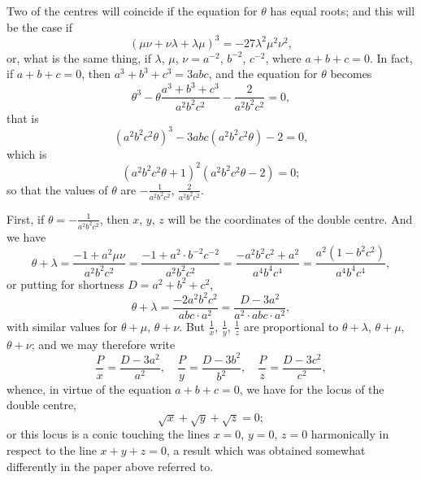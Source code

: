 \documentclass[11pt,a4paper]{article}
\theoremstyle{plain}
\begin{document}
Two of the centres will coincide if the equation for $\theta$ has equal roots; and this will be the case if
\[
(\mu\nu + \nu\lambda + \lambda\mu)^3 = -27\lambda^2\mu^2\nu^2,
\]
or, what is the same thing, if $\lambda$, $\mu$, $\nu = a^{-2}$, $b^{-2}$, $c^{-2}$, where $a + b + c = 0$. In fact, if $a + b + c = 0$, then $a^3 + b^3 + c^3 = 3abc$, and the equation for $\theta$ becomes
\[
\theta^3 - \theta\frac{a^3 + b^3 + c^3}{a^2b^2c^2} - \frac{2}{a^2b^2c^2} = 0,
\]
that is
\[
(a^2b^2c^2\theta)^3 - 3abc(a^2b^2c^2\theta) - 2 = 0,
\]
which is
\[
(a^2b^2c^2\theta + 1)^2(a^2b^2c^2\theta - 2) = 0;
\]
so that the values of $\theta$ are $-\frac{1}{a^2b^2c^2}$, $\frac{2}{a^2b^2c^2}$.

\newpage
First, if $\theta = -\frac{1}{a^2b^2c^2}$, then $x$, $y$, $z$ will be the coordinates of the double centre. And we have
\[
\theta + \lambda = \frac{-1 + a^2\mu\nu}{a^2b^2c^2} = \frac{-1 + a^2 \cdot b^{-2}c^{-2}}{a^2b^2c^2} = \frac{-a^2b^2c^2 + a^2}{a^4b^4c^4} = \frac{a^2(1 - b^2c^2)}{a^4b^4c^4},
\]
or putting for shortness $D = a^2 + b^2 + c^2$,
\[
\theta + \lambda = \frac{-2a^2b^2c^2}{abc \cdot a^2} = \frac{D - 3a^2}{a^2 \cdot abc \cdot a^2},
\]
with similar values for $\theta + \mu$, $\theta + \nu$. But $\frac{1}{x}$, $\frac{1}{y}$, $\frac{1}{z}$ are proportional to $\theta + \lambda$, $\theta + \mu$, $\theta + \nu$; and we may therefore write
\[
\frac{P}{x} = \frac{D - 3a^2}{a^2}, \quad \frac{P}{y} = \frac{D - 3b^2}{b^2}, \quad \frac{P}{z} = \frac{D - 3c^2}{c^2},
\]
whence, in virtue of the equation $a + b + c = 0$, we have for the locus of the double centre,
\[
\sqrt{x} + \sqrt{y} + \sqrt{z} = 0;
\]
or this locus is a conic touching the lines $x = 0$, $y = 0$, $z = 0$ harmonically in respect to the line $x + y + z = 0$, a result which was obtained somewhat differently in the paper above referred to.
\end{document}
